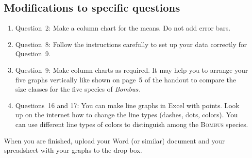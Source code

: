 \documentclass[12pt]{exam}
\begin{document}
\subsection*{Modifications to specific questions}

\begin{enumerate}[resume]

\item Question~2: Make a column chart for the means. Do not add error bars.

\item Question~8: Follow the instructions carefully to set up your data correctly for Question~9.

\item Question~9: Make column charts as required. It may help you to arrange your five graphs vertically like shown on page~5 of the handout to compare the size classes for the five species of \textit{Bombus.}

\item Questions~16 and 17: You can make line graphs in Excel with points. Look up on the internet how to change the line types (dashes, dots, colors). You can use different line types of colors to distinguish among the \textsc{Bombus} species.


\end{enumerate}

When you are finished, upload your Word (or similar) document and your spreadsheet with your graphs to the drop box.
\end{document}
